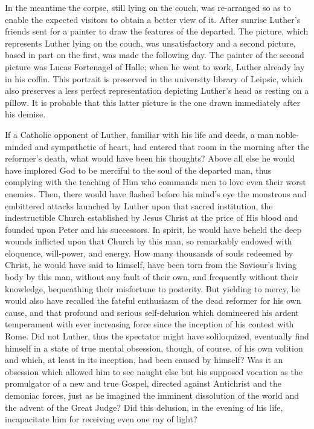 In the meantime the corpse, still lying on the couch, was re-arranged
so as to enable the expected visitors to obtain a better view of it.
After sunrise Luther’s friends sent for a painter to draw the features
of the departed. The picture, which represents Luther lying on the
couch, was unsatisfactory and a second picture, based in part on the
first, was made the following day. The painter of the second picture
was Lucas Fortenagel of Halle; when he went to work, Luther already
lay in his coffin. This portrait is preserved in the university library of
Leipsic, which also preserves a less perfect representation depicting
Luther’s head as resting on a pillow. It is probable that this latter
picture is the one drawn immediately after his demise.

If a Catholic opponent of Luther, familiar with his life and deeds,
a man noble-minded and sympathetic of heart, had entered that room
in the morning after the reformer’s death, what would have been his
thoughts? Above all else he would have implored God to be merciful
to the soul of the departed man, thus complying with the teaching of
Him who commands men to love even their worst enemies. Then,
there would have flashed before his mind’s eye the monstrous and
embittered attacks launched by Luther upon that sacred institution,
the indestructible Church established by Jesus Christ at the price of
His blood and founded upon Peter and his successors. In spirit, he
would have beheld the deep wounds inflicted upon that Church by
this man, so remarkably endowed with eloquence, will-power, and
energy. How many thousands of souls redeemed by Christ, he would
have said to himself, have been torn from the Saviour’s living body by
this man, without any fault of their own, and frequently without
their knowledge, bequeathing their misfortune to posterity. But yielding
to mercy, he would also have recalled the fateful enthusiasm of
the dead reformer for his own cause, and that profound and serious
self-delusion which domineered his ardent temperament with ever
increasing force since the inception of his contest with Rome. Did not
Luther, thus the spectator might have soliloquized, eventually find
himself in a state of true mental obsession, though, of course, of his
own volition and which, at least in its inception, had been caused by
himself? Was it an obsession which allowed him to see naught else but
his supposed vocation as the promulgator of a new and true Gospel,
directed against Antichrist and the demoniac forces, just as he imagined
the imminent dissolution of the world and the advent of the
Great Judge? Did this delusion, in the evening of his life, incapacitate
him for receiving even one ray of light?

